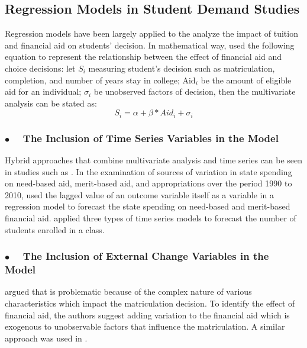 \documentclass[12pt,english]{report}
\begin{document}
\subsection{Regression Models in Student Demand Studies}
 Regression models have been largely applied to the analyze the impact of tuition and financial aid on students' decision.
 In mathematical way,
\citet{Dynarski2002} used the following equation to represent the relationship between the effect of financial aid and choice decisions:
let $S_i$ measuring student's decision such as matriculation, completion, and number of years stay in college; Aid$_i$ be the amount of eligible aid for an individual; $\sigma_i$  be unobserved factors of decision, then the multivariate analysis can be stated as: $$S_i = \alpha + \beta * Aid_i + \sigma_i$$



\subsubsection{$\bullet \quad$  The Inclusion of Time Series Variables in 
the Model} Hybrid approaches that combine multivariate analysis and time 
series can be seen in studies such as \citep{Heller1999}. In the 
examination of sources of variation in state spending on need-based aid, 
merit-based aid, and appropriations over the period 1990 to 2010,  
\citet{McLendon2014} used the lagged value of an outcome variable itself 
as a variable in a regression model to forecast the state spending on 
need-based and merit-based financial aid. \citet{Lavilles2012} applied 
three types of time series models to forecast the number of students 
enrolled in a class.

\subsubsection{$\bullet \quad$  The Inclusion of External Change Variables in the Model} 

\citet{Dynarski2003} argued that  is problematic because of the complex nature of various 
characteristics which impact the matriculation decision. To identify the 
effect of financial aid, the authors suggest adding variation to the 
financial aid which is exogenous to unobservable factors that influence 
the matriculation.  A similar approach was used in \citep{Dynarski2003, 
Abraham2006}.
\end{document}
